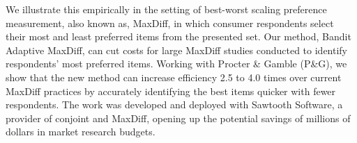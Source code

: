 \documentclass[a4paper,12pt]{article}
\begin{document}
We illustrate this empirically in the setting of best-worst scaling preference measurement, also known as, MaxDiff, in which consumer respondents select their most and least preferred items from the presented set. Our method, Bandit Adaptive MaxDiff, can cut costs for large MaxDiff studies conducted to identify respondents’ most preferred items. Working with Procter \& Gamble (P\&G), we show that the new method can increase efficiency 2.5 to 4.0 times over current MaxDiff practices by accurately identifying the best items quicker with fewer respondents. The work was developed and deployed with Sawtooth Software, a provider of conjoint and MaxDiff, opening up the potential savings of millions of dollars in market research budgets. 









\end{document}
